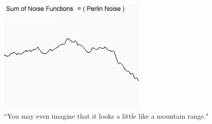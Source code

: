 \begin{figure}[htbp]
	\centering
	\includegraphics[width=0.65\textwidth]{img/Theory/Perlin_Noise/perlin1.png}
	\caption{``You may even imagine that it looks a little like a mountain range."}
	\label{fig:noise}
\end{figure}




